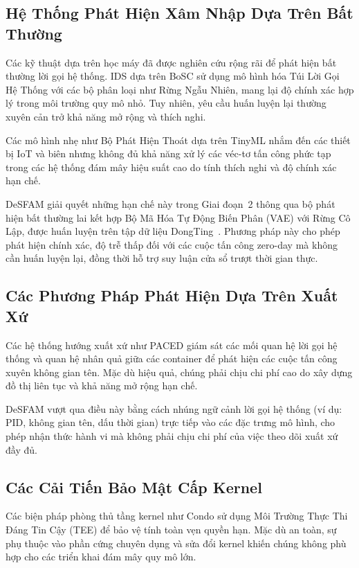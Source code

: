 \subsection{Hệ Thống Phát Hiện Xâm Nhập Dựa Trên Bất Thường}
\label{subsec:anomaly_ids}

Các kỹ thuật dựa trên học máy đã được nghiên cứu rộng rãi để phát hiện bất thường lời gọi hệ
thống. IDS dựa trên BoSC sử dụng mô hình hóa Túi Lời Gọi Hệ Thống với các bộ phân loại như
Rừng Ngẫu Nhiên, mang lại độ chính xác hợp lý trong môi trường quy mô nhỏ. Tuy nhiên, yêu cầu
huấn luyện lại thường xuyên cản trở khả năng mở rộng và thích nghi.

Các mô hình nhẹ như Bộ Phát Hiện Thoát dựa trên TinyML nhắm đến các thiết bị IoT và biên nhưng
không đủ khả năng xử lý các véc-tơ tấn công phức tạp trong các hệ thống đám mây hiệu suất cao
do tính thích nghi và độ chính xác hạn chế.

DeSFAM giải quyết những hạn chế này trong Giai đoạn~2 thông qua bộ phát hiện bất thường lai kết
hợp Bộ Mã Hóa Tự Động Biến Phân (VAE) với Rừng Cô Lập, được huấn luyện trên tập dữ liệu
DongTing~\cite{ref26_dongtingdataset}. Phương pháp này cho phép phát hiện chính xác, độ trễ thấp
đối với các cuộc tấn công zero-day mà không cần huấn luyện lại, đồng thời hỗ trợ suy luận cửa
sổ trượt thời gian thực.

\subsection{Các Phương Pháp Phát Hiện Dựa Trên Xuất Xứ}
\label{subsec:provenance}

Các hệ thống hướng xuất xứ như PACED giám sát các mối quan hệ lời gọi hệ thống và quan hệ nhân
quả giữa các container để phát hiện các cuộc tấn công xuyên không gian tên. Mặc dù hiệu quả,
chúng phải chịu chi phí cao do xây dựng đồ thị liên tục và khả năng mở rộng hạn chế.

DeSFAM vượt qua điều này bằng cách nhúng ngữ cảnh lời gọi hệ thống (ví dụ: PID, không gian tên,
dấu thời gian) trực tiếp vào các đặc trưng mô hình, cho phép nhận thức hành vi mà không phải
chịu chi phí của việc theo dõi xuất xứ đầy đủ.

\subsection{Các Cải Tiến Bảo Mật Cấp Kernel}
\label{subsec:kernel_security}

Các biện pháp phòng thủ tầng kernel như Condo sử dụng Môi Trường Thực Thi Đáng Tin Cậy (TEE) để
bảo vệ tính toàn vẹn quyền hạn. Mặc dù an toàn, sự phụ thuộc vào phần cứng chuyên dụng và sửa
đổi kernel khiến chúng không phù hợp cho các triển khai đám mây quy mô lớn.


